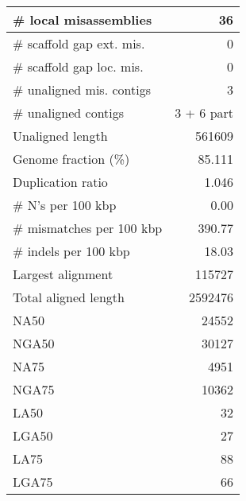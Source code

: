 \documentclass[12pt,a4paper]{article}
\begin{document}
\begin{table}[ht]
\begin{center}
\begin{tabular}{|l*{1}{|r}|}
\# local misassemblies & 36 \\ \hline
\# scaffold gap ext. mis. & 0 \\ \hline
\# scaffold gap loc. mis. & 0 \\ \hline
\# unaligned mis. contigs & 3 \\ \hline
\# unaligned contigs & 3 + 6 part \\ \hline
Unaligned length & 561609 \\ \hline
Genome fraction (\%) & 85.111 \\ \hline
Duplication ratio & 1.046 \\ \hline
\# N's per 100 kbp & 0.00 \\ \hline
\# mismatches per 100 kbp & 390.77 \\ \hline
\# indels per 100 kbp & 18.03 \\ \hline
Largest alignment & 115727 \\ \hline
Total aligned length & 2592476 \\ \hline
NA50 & 24552 \\ \hline
NGA50 & 30127 \\ \hline
NA75 & 4951 \\ \hline
NGA75 & 10362 \\ \hline
LA50 & 32 \\ \hline
LGA50 & 27 \\ \hline
LA75 & 88 \\ \hline
LGA75 & 66 \\ \hline
\end{tabular}
\end{center}
\end{table}
\end{document}
